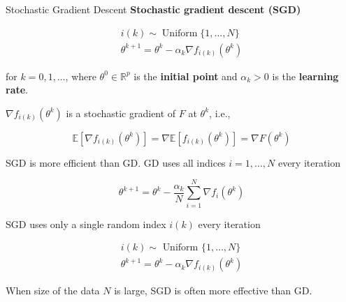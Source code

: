 \begin{frame}[allowframebreaks]

\begin{mydefinitionblock}{2.9}{Stochastic Gradient Descent}
    \textbf{Stochastic gradient descent (SGD)}

    $$
    \begin{gathered}
    i(k) \sim \operatorname{Uniform}\{1, \ldots, N\} \\
    \theta^{k+1}=\theta^{k}-\alpha_{k} \nabla f_{i(k)}\left(\theta^{k}\right)
    \end{gathered}
    $$

    for $k=0,1, \ldots$, where $\theta^{0} \in \mathbb{R}^{p}$ is the \textbf{initial point} and $\alpha_{k}>0$ is the \textbf{learning rate}.

    $\nabla f_{i(k)}\left(\theta^{k}\right)$ is a stochastic gradient of $F$ at $\theta^{k}$, i.e.,

    $$
    \mathbb{E}\left[\nabla f_{i(k)}\left(\theta^{k}\right)\right]=\nabla \mathbb{E}\left[f_{i(k)}\left(\theta^{k}\right)\right]=\nabla F\left(\theta^{k}\right)
    $$
\end{mydefinitionblock}

\end{frame}

\begin{frame}[allowframebreaks]

\begin{myconceptblock}{2.10}{SGD is more efficient than GD.}
    GD uses all indices $i=1, \ldots, N$ every iteration

    $$
    \theta^{k+1}=\theta^{k}-\frac{\alpha_{k}}{N} \sum_{i=1}^{N} \nabla f_{i}\left(\theta^{k}\right)
    $$

    SGD uses only a single random index $i(k)$ every iteration

    $$
    \begin{gathered}
    i(k) \sim \text { Uniform }\{1, \ldots, N\} \\
    \theta^{k+1}=\theta^{k}-\alpha_{k} \nabla f_{i(k)}\left(\theta^{k}\right)
    \end{gathered}
    $$

    When size of the data $N$ is large, SGD is often more effective than GD.
\end{myconceptblock}

\end{frame}

